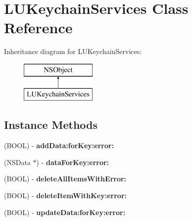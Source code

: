 \hypertarget{interface_l_u_keychain_services}{}\section{L\+U\+Keychain\+Services Class Reference}
\label{interface_l_u_keychain_services}
Inheritance diagram for L\+U\+Keychain\+Services\+:\begin{figure}[H]
\begin{center}
\leavevmode
\includegraphics[height=2.000000cm]{interface_l_u_keychain_services}
\end{center}
\end{figure}
\subsection*{Instance Methods}
\begin{DoxyCompactItemize}
\item 
\mbox{\label{interface_l_u_keychain_services_a1feccf44fa5e07b9344c41cdb9a4628f}} 
(B\+O\+OL) -\/ {\bfseries add\+Data\+:for\+Key\+:error\+:}
\item 
\mbox{\label{interface_l_u_keychain_services_afcc434286ce6f83cfe3d6557d7e6f588}} 
(N\+S\+Data $\ast$) -\/ {\bfseries data\+For\+Key\+:error\+:}
\item 
\mbox{\label{interface_l_u_keychain_services_a29826893a1306714776c3abcd6348666}} 
(B\+O\+OL) -\/ {\bfseries delete\+All\+Items\+With\+Error\+:}
\item 
\mbox{\label{interface_l_u_keychain_services_ac48065b3c8e6e16b66f1f429eade9c84}} 
(B\+O\+OL) -\/ {\bfseries delete\+Item\+With\+Key\+:error\+:}
\item 
\mbox{\label{interface_l_u_keychain_services_a5cadd64c760a69004b5e7920f6c29b9e}} 
(B\+O\+OL) -\/ {\bfseries update\+Data\+:for\+Key\+:error\+:}
\end{DoxyCompactItemize}
